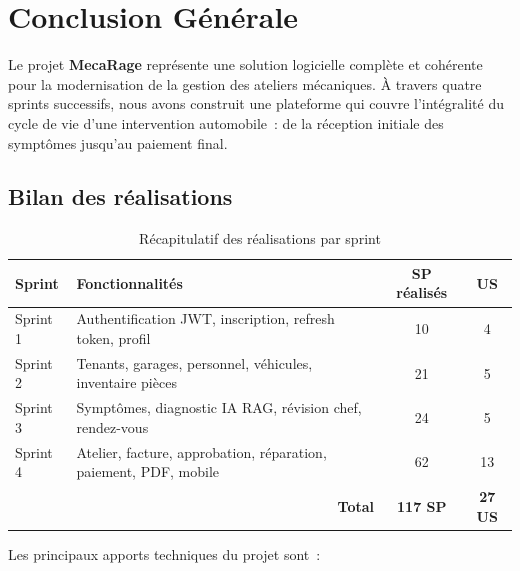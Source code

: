 \chapter*{Conclusion Générale}
\thispagestyle{plain}


Le projet \textbf{MecaRage} représente une solution logicielle complète et
cohérente pour la modernisation de la gestion des ateliers mécaniques. À travers
quatre sprints successifs, nous avons construit une plateforme qui couvre
l'intégralité du cycle de vie d'une intervention automobile~: de la réception
initiale des symptômes jusqu'au paiement final.

\section*{Bilan des réalisations}

\begin{table}[H]
\centering
\begin{tabularx}{\textwidth}{|l|X|c|c|}
\hline
\rowcolor{gray!20}
\textbf{Sprint} & \textbf{Fonctionnalités} & \textbf{SP réalisés} & \textbf{US} \\
\hline
Sprint 1 & Authentification JWT, inscription, refresh token, profil & 10 & 4 \\[2pt]\hline
Sprint 2 & Tenants, garages, personnel, véhicules, inventaire pièces & 21 & 5 \\[2pt]\hline
Sprint 3 & Symptômes, diagnostic IA RAG, révision chef, rendez-vous & 24 & 5 \\[2pt]\hline
Sprint 4 & Atelier, facture, approbation, réparation, paiement, PDF, mobile & 62 & 13 \\[2pt]\hline
\multicolumn{2}{|r|}{\textbf{Total}} & \textbf{117 SP} & \textbf{27 US} \\
\hline
\end{tabularx}
\caption{Récapitulatif des réalisations par sprint}
\label{tab:bilan}
\end{table}

\noindent Les principaux apports techniques du projet sont~:

